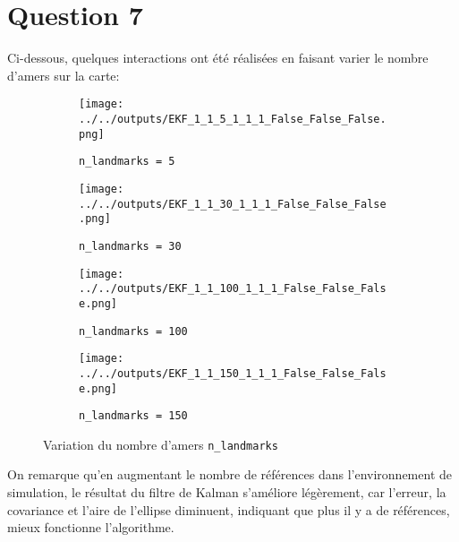 \documentclass[../CSC_5RO12_TA_TP2.tex]{subfiles}
\begin{document}
\section{Question 7}
\noindent Ci-dessous, quelques interactions ont été réalisées en faisant varier le nombre d'amers sur la carte:
\begin{figure}[H]
    \centering
    \begin{subfigure}[b]{0.475\textwidth}
        \centering
        \texttt{[image: ../../outputs/EKF\_1\_1\_5\_1\_1\_1\_False\_False\_False.png]}
        \caption{\texttt{n\_landmarks = 5}}
        \label{}
    \end{subfigure}\hfill
    \begin{subfigure}[b]{0.475\textwidth}
        \centering
        \texttt{[image: ../../outputs/EKF\_1\_1\_30\_1\_1\_1\_False\_False\_False.png]}
        \caption{\texttt{n\_landmarks = 30}}
        \label{}
    \end{subfigure}
    \begin{subfigure}[b]{0.475\textwidth}
        \centering
        \texttt{[image: ../../outputs/EKF\_1\_1\_100\_1\_1\_1\_False\_False\_False.png]}
        \caption{\texttt{n\_landmarks = 100}}
        \label{}
    \end{subfigure}\hfill
    \begin{subfigure}[b]{0.475\textwidth}
        \centering
        \texttt{[image: ../../outputs/EKF\_1\_1\_150\_1\_1\_1\_False\_False\_False.png]}
        \caption{\texttt{n\_landmarks = 150}}
        \label{}
    \end{subfigure}
    \caption{Variation du nombre d'amers \texttt{n\_landmarks}}
    \label{}
\end{figure}
\noindent On remarque qu'en augmentant le nombre de références dans l'environnement de simulation, le résultat du filtre de Kalman s'améliore légèrement, car l'erreur, la covariance et l'aire de l'ellipse diminuent, indiquant que plus il y a de références, mieux fonctionne l'algorithme.\\
\end{document}
